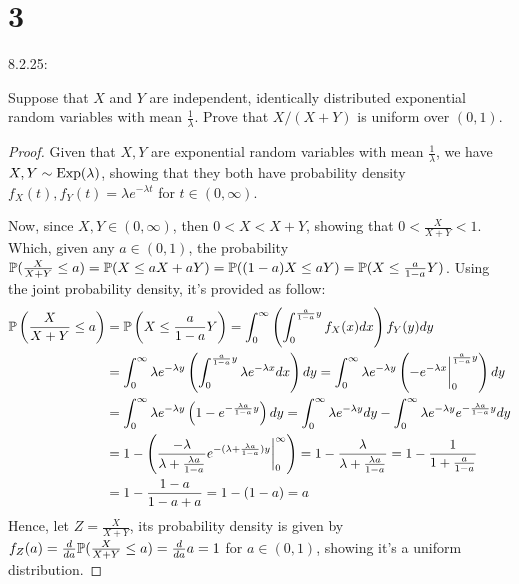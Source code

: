 \documentclass{article}
\begin{document}
\hfil

\section*{3}
\begin{ques}\label{q3}
    8.2.25:

    Suppose that $X$ and $Y$ are independent, identically distributed exponential random variables with mean $\frac{1}{\lambda}$. Prove that $X/(X+Y)$ is uniform over $(0,1)$.
\end{ques}

\begin{proof}
    Given that $X,Y$ are exponential random variables with mean $\frac{1}{\lambda}$, we have $X,Y\sim \mathrm{Exp}(\lambda)$, showing that they both have probability density $f_X(t),f_Y(t)=\lambda e^{-\lambda t}$ for $t\in(0,\infty)$. 

    Now, since $X,Y\in (0,\infty)$, then $0<X<X+Y$, showing that $0<\frac{X}{X+Y}<1$. Which, given any $a\in (0,1)$, the probability $\mathbb{P}(\frac{X}{X+Y}\leq a) = \mathbb{P}(X\leq aX+aY) = \mathbb{P}((1-a)X\leq aY) = \mathbb{P}(X\leq \frac{a}{1-a}Y)$. Using the joint probability density, it's provided as follow:
    \begin{align}
        \mathbb{P}\left(\frac{X}{X+Y}\leq a\right)&= \mathbb{P}\left(X\leq \frac{a}{1-a}Y\right) = \int_{0}^{\infty}\left(\int_{0}^{\frac{a}{1-a}y}f_X(x)dx\right)f_Y(y)dy\\
        &= \int_{0}^{\infty}\lambda e^{-\lambda y}\left(\int_{0}^{\frac{a}{1-a}y}\lambda e^{-\lambda x}dx\right)dy = \int_{0}^{\infty}\lambda e^{-\lambda y}\left(-e^{-\lambda x}\bigg|_{0}^{\frac{a}{1-a}y}\right)dy\\
        &= \int_{0}^{\infty}\lambda e^{-\lambda y}\left(1-e^{-\frac{\lambda a}{1-a}y}\right)dy = \int_{0}^{\infty}\lambda e^{-\lambda y}dy - \int_{0}^{\infty}\lambda e^{-\lambda y}e^{-\frac{\lambda a}{1-a}y}dy\\
        &= 1-\left(\frac{-\lambda}{\lambda +\frac{\lambda a}{1-a}}e^{-(\lambda + \frac{\lambda a}{1-a})y}\bigg|_{0}^{\infty}\right) = 1-\frac{\lambda}{\lambda + \frac{\lambda a}{1-a}} = 1-\frac{1}{1+\frac{a}{1-a}}\\
        &= 1-\frac{1-a}{1-a+a} = 1-(1-a) = a
    \end{align}
    Hence, let $Z=\frac{X}{X+Y}$, its probability density is given by $f_Z(a) = \frac{d}{da}\mathbb{P}(\frac{X}{X+Y}\leq a)=\frac{d}{da}a = 1$ for $a\in(0,1)$, showing it's a uniform distribution.
\end{proof}
\end{document}
